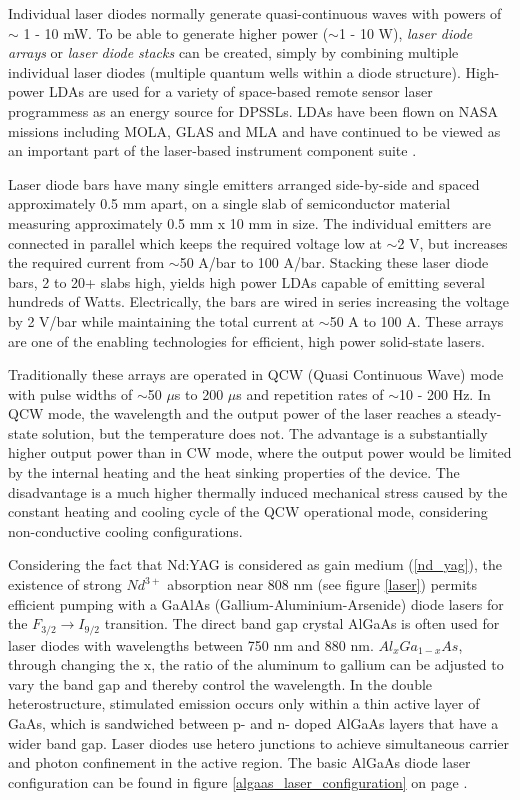 Individual \acs{laser} diodes normally generate quasi-continuous waves with powers of $\sim$ 1 - 10 mW. To be able to generate higher power ($\sim$1 - 10 W), \textit{laser diode arrays} or \textit{laser diode stacks} can be created, simply by combining multiple individual \acs{laser} diodes (multiple quantum wells within a diode structure). High-power \acp{LDA} are used for a variety of space-based remote sensor laser programmess as an energy source for \acp{DPSSL}. \acp{LDA} have been flown on NASA missions including MOLA, GLAS and MLA and have continued to be viewed as an important part of the \acs{laser}-based instrument component suite \cite{lda_main}. 

Laser diode bars have many single emitters arranged side-by-side and spaced approximately 0.5 mm apart, on a single slab of semiconductor material measuring approximately 0.5 mm x 10 mm in size. The individual emitters are connected in parallel which keeps the required voltage low at $\sim$2 V, but increases the required current from $\sim$50 A/bar to 100 A/bar. Stacking these laser diode bars, 2 to 20+ slabs high, yields high power \acp{LDA} capable of emitting several hundreds of Watts. Electrically, the bars are wired in series increasing the voltage by 2 V/bar while maintaining the total current at $\sim$50 A to 100 A. These arrays are one of the enabling technologies for efficient, high power solid-state lasers.

Traditionally these arrays are operated in QCW (Quasi Continuous Wave) mode with pulse widths of $\sim$50 $\mu$s to 200 $\mu$s and repetition rates of $\sim$10 - 200 Hz. In QCW mode, the wavelength and the output power of the laser reaches a steady-state solution, but the temperature does not. The advantage is a substantially higher output power than in CW mode, where the output power would be limited by the internal heating and the heat sinking properties of the device. The disadvantage is a much higher thermally induced mechanical stress caused by the constant heating and cooling cycle of the QCW operational mode, considering non-conductive cooling configurations.

Considering the fact that Nd:YAG is considered as gain medium (\ref{nd_yag}), the existence of strong $Nd^{3+}$ absorption near 808 nm (see figure \ref{laser}) permits efficient pumping with a GaAlAs (Gallium-Aluminium-Arsenide) diode \acp{laser} for the $F_{3/2}\rightarrow I_{9/2}$ transition. The direct band gap crystal AlGaAs is often used for laser diodes with wavelengths between 750 nm and 880 nm. $Al_{x}Ga_{1-x}As$, through changing the x, the ratio of the aluminum to gallium can be adjusted to vary the band gap and thereby control the wavelength. In the double heterostructure, stimulated emission occurs only within a thin active layer of GaAs, which is sandwiched between p- and n- doped AlGaAs layers that have a wider band gap. Laser diodes use hetero junctions to achieve simultaneous carrier and photon confinement in the active region. The basic AlGaAs diode \acs{laser} configuration can be found in figure \ref{algaas_laser_configuration} on page \pageref{algaas_laser_configuration}.

